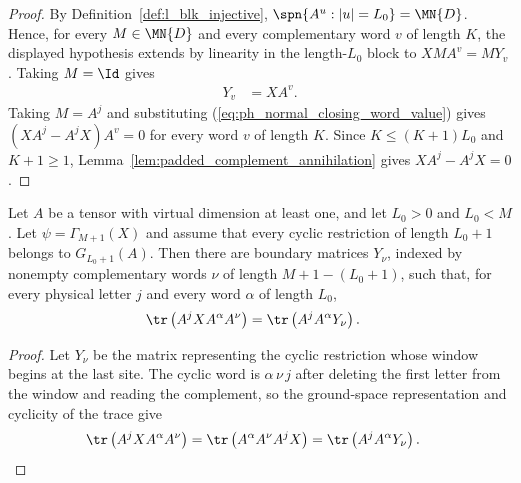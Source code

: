 \begin{proof}
    \leanok
    By Definition~\ref{def:l_blk_injective},
    $\spn\{A^u : |u|=L_0\} = \MN{D}$.
    Hence, for every $M\in\MN{D}$ and every complementary word $v$ of length
    $K$, the displayed hypothesis extends by linearity in the length-$L_0$
    block to $XMA^v=MY_v$. Taking $M=\Id$ gives
    \begin{align}
        Y_v & = X A^v.
        \label{eq:ph_normal_closing_word_value}
    \end{align}
    Taking $M=A^j$ and substituting (\ref{eq:ph_normal_closing_word_value})
    gives $(X A^j-A^jX)A^v=0$ for every word $v$ of length $K$.
    Since $K\le (K+1)L_0$ and $K+1\ge1$,
    Lemma~\ref{lem:padded_complement_annihilation} gives
    $X A^j-A^jX=0$.
\end{proof}

\begin{lemma}
    \label{lem:closure_property_boundary_block_window_trace_ground_space_map}
    \leanok
    Let $A$ be a tensor with virtual dimension at least one, and let
    $L_0>0$ and $L_0<M$. Let $\psi=\Gamma_{M+1}(X)$ and assume that every
    cyclic restriction of length $L_0+1$ belongs to $G_{L_0+1}(A)$. Then there
    are boundary matrices $Y_\nu$, indexed by nonempty complementary words
    $\nu$ of length $M+1-(L_0+1)$, such that, for every physical letter $j$
    and every word $\alpha$ of length $L_0$,
    \begin{align}
        \tr\left(A^j X A^\alpha A^\nu\right)
         & = \tr\left(A^j A^\alpha Y_\nu\right).
        \notag
    \end{align}
\end{lemma}

\begin{proof}
    \leanok
    Let $Y_\nu$ be the matrix representing the cyclic restriction whose window
    begins at the last site. The cyclic word is $\alpha\,\nu\,j$ after deleting
    the first letter from the window and reading the complement, so the
    ground-space representation and cyclicity of the trace give
    \begin{align}
        \tr\left(A^jX A^\alpha A^\nu\right)
         & = \tr\left(A^\alpha A^\nu A^jX\right)
        = \tr\left(A^jA^\alpha Y_\nu\right).
        \notag
    \end{align}
\end{proof}

